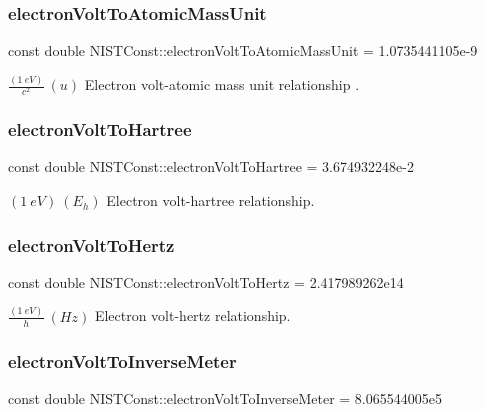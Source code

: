 \subsubsection{\texorpdfstring{electron\+Volt\+To\+Atomic\+Mass\+Unit}{electronVoltToAtomicMassUnit}}
{\footnotesize\ttfamily const double N\+I\+S\+T\+Const\+::electron\+Volt\+To\+Atomic\+Mass\+Unit = 1.\+0735441105e-\/9}

$\frac{(1\ eV)}{c^2}\ (u)$ Electron volt-\/atomic mass unit relationship . \mbox{\label{group___electron_volt_gab05ba497cc5a6bd566356469e9de003a}} 
\subsubsection{\texorpdfstring{electron\+Volt\+To\+Hartree}{electronVoltToHartree}}
{\footnotesize\ttfamily const double N\+I\+S\+T\+Const\+::electron\+Volt\+To\+Hartree = 3.\+674932248e-\/2}

$(1\ eV) \ (E_h)$ Electron volt-\/hartree relationship. \mbox{\label{group___electron_volt_gae80c1242d33bf681a09a87d20cd4162e}} 
\subsubsection{\texorpdfstring{electron\+Volt\+To\+Hertz}{electronVoltToHertz}}
{\footnotesize\ttfamily const double N\+I\+S\+T\+Const\+::electron\+Volt\+To\+Hertz = 2.\+417989262e14}

$\frac{(1\ eV)}{h} \ (Hz)$ Electron volt-\/hertz relationship. \mbox{\label{group___electron_volt_ga4c109b95727a76ae489a8dec36a88b65}} 
\subsubsection{\texorpdfstring{electron\+Volt\+To\+Inverse\+Meter}{electronVoltToInverseMeter}}
{\footnotesize\ttfamily const double N\+I\+S\+T\+Const\+::electron\+Volt\+To\+Inverse\+Meter = 8.\+065544005e5}

